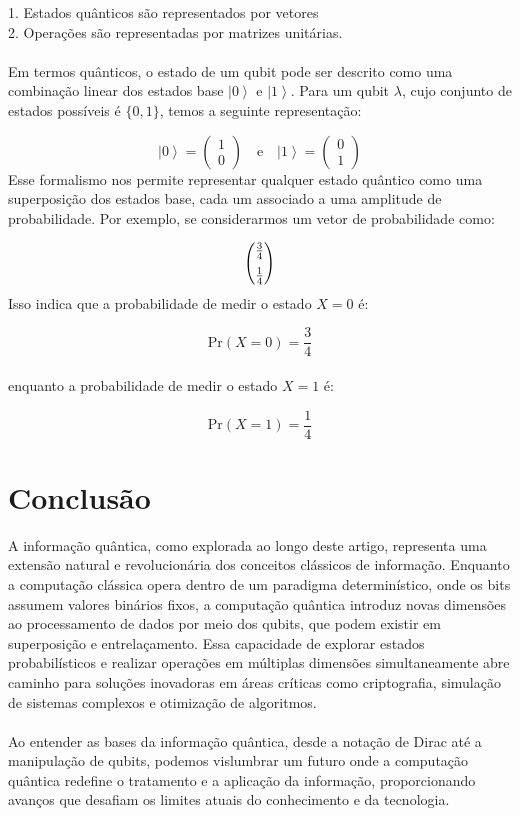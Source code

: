 \documentclass[11pt]{article}
\begin{document}
1. Estados quânticos são representados por vetores \\

2. Operações são representadas por matrizes unitárias.\\
\\
Em termos quânticos, o estado de um qubit pode ser descrito como uma combinação linear dos estados base \( \left|0\right\rangle \) e \( \left|1\right\rangle \). Para um qubit \(\lambda\), cujo conjunto de estados possíveis é \(\{0, 1\}\), temos a seguinte representação:

\[
\left|0\right\rangle = \begin{pmatrix}
1 \\
0
\end{pmatrix}
\quad \text{e} \quad
\left|1\right\rangle = \begin{pmatrix}
0 \\
1
\end{pmatrix}
\]
Esse formalismo nos permite representar qualquer estado quântico como uma superposição dos estados base, cada um associado a uma amplitude de probabilidade. Por exemplo, se considerarmos um vetor de probabilidade como:

\[
\begin{pmatrix}
\frac{3}{4} \vspace{0.2cm} \\
\frac{1}{4}
\end{pmatrix}
\]
Isso indica que a probabilidade de medir o estado \(X=0\) é:

\[
\text{Pr}(X=0) = \frac{3}{4}
\] \\
enquanto a probabilidade de medir o estado \(X=1\) é:

\[
\text{Pr}(X=1) = \frac{1}{4}
\]

\section{Conclusão}
A informação quântica, como explorada ao longo deste artigo, representa uma extensão natural e revolucionária dos conceitos clássicos de informação. Enquanto a computação clássica opera dentro de um paradigma determinístico, onde os bits assumem valores binários fixos, a computação quântica introduz novas dimensões ao processamento de dados por meio dos qubits, que podem existir em superposição e entrelaçamento. Essa capacidade de explorar estados probabilísticos e realizar operações em múltiplas dimensões simultaneamente abre caminho para soluções inovadoras em áreas críticas como criptografia, simulação de sistemas complexos e otimização de algoritmos. \\ \\
Ao entender as bases da informação quântica, desde a notação de Dirac até a manipulação de qubits, podemos vislumbrar um futuro onde a computação quântica redefine o tratamento e a aplicação da informação, proporcionando avanços que desafiam os limites atuais do conhecimento e da tecnologia.
\end{document}
